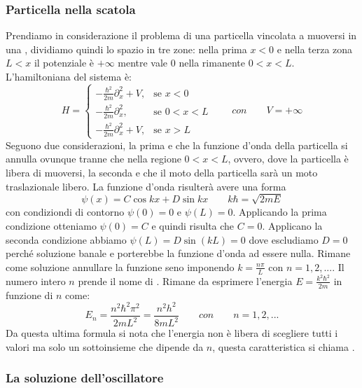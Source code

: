 \subsubsection{Particella nella scatola}
Prendiamo in considerazione il problema di una particella vincolata a muoversi in una , dividiamo quindi lo spazio in tre zone: nella prima $x < 0$ e nella terza zona $L < x$ il potenziale è $+\infty$ mentre vale $0$ nella rimanente $0 < x < L$. L'hamiltoniana del sistema è:
$$H=\begin{cases}
 - \frac{\hbar^2}{2m} \partial_x^2 + V, & \mbox{se } x<0   \\
 - \frac{\hbar^2}{2m} \partial_x^2,     & \mbox{se } 0<x<L \\
 - \frac{\hbar^2}{2m} \partial_x^2 + V, & \mbox{se } x>L
\end{cases} \qquad con \qquad V = +\infty$$
Seguono due considerazioni, la prima e che la funzione d'onda della particella si annulla ovunque tranne che nella regione $0 < x < L$, ovvero, dove la particella è libera di muoversi, la seconda e che il moto della particella sarà un moto traslazionale libero. La funzione d'onda risulterà avere una forma
$$\psi(x) = C \cos{kx} + D \sin{kx} \qquad k\hbar = \sqrt{2mE}$$
con condiziondi di contorno $\psi(0) = 0$ e $\psi(L) = 0$. Applicando la prima condizione otteniamo $\psi(0) = C$ e quindi risulta che $C = 0$. Applicano la seconda condizione abbiamo $\psi(L) = D \sin(kL) = 0$ dove escludiamo $D = 0$ perché soluzione banale e porterebbe la funzione d'onda ad essere nulla. Rimane come soluzione annullare la funzione seno imponendo $k = \frac{n\pi}{L}$ con $n = 1, 2, ...$. Il numero intero $n$ prende il nome di . Rimane da esprimere l'energia $E = \frac{k^2 \hbar^2}{2m}$ in funzione di $n$ come:
$$E_n = \frac{n^2 \hbar^2 \pi^2}{2 m L^2} = \frac{n^2 h^2}{8 m L^2} \qquad con \qquad n = 1, 2, ...$$
Da questa ultima formula si nota che l'energia non è libera di scegliere tutti i valori ma solo un sottoinsieme che dipende da $n$, questa caratteristica si chiama .

\subsubsection{La soluzione dell'oscillatore}
